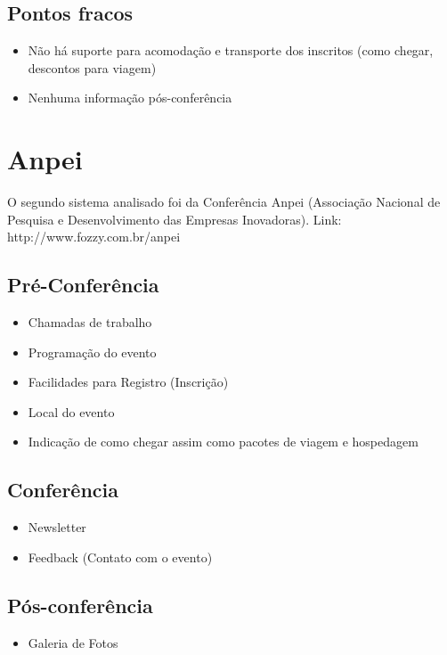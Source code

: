 \documentclass[letter]{article}
\begin{document}
\subsection{Pontos fracos}
\begin{itemize}
\item Não há suporte para acomodação e transporte dos inscritos (como chegar, descontos para viagem)
\item Nenhuma informação pós-conferência
\end{itemize}

\section{ Anpei}
O segundo sistema analisado foi da Conferência Anpei (Associação Nacional de Pesquisa e Desenvolvimento das Empresas Inovadoras). Link: http://www.fozzy.com.br/anpei

\subsection{Pré-Conferência}

\begin{itemize}
\item Chamadas de trabalho
\item Programação do evento
\item Facilidades para Registro (Inscrição)
\item Local do evento
\item Indicação de como chegar assim como pacotes de viagem e hospedagem        \end{itemize}

\subsection{Conferência}
\begin{itemize}
\item Newsletter
\item Feedback (Contato com o evento)
\end{itemize}

\subsection{Pós-conferência}
\begin{itemize}
\item Galeria de Fotos
\end{itemize}
\end{document}
